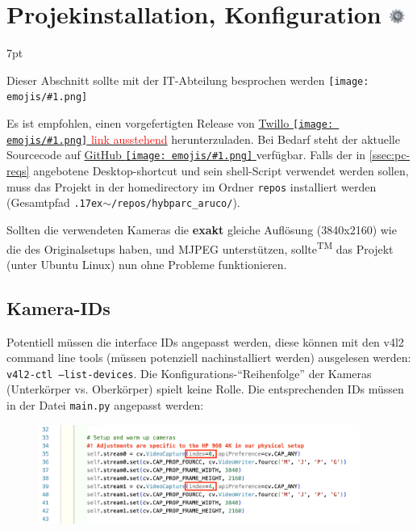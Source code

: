 \documentclass[a4paper, 10pt]{article}
\newcommand{\warn}[1]{\textcolor{red}{#1}}
\newcommand{\code}[1]{\texttt{#1}}
\newcommand{\emoji}[1]{
    \begingroup\normalfont
    \texttt{[image: emojis/\#1.png]}
    \endgroup
}
\newcommand{\realtilde}{{\raise.17ex\hbox{$\scriptstyle \mathtt{\sim}$}}}
\newenvironment{tooltip}{%
\small
\vspace*{-4mm}
    \def\FrameCommand{%
    \hspace{1pt}%
    {\color{tooltippipe}\vrule width 0.7mm}%
    {\color{tooltipshade}\vrule width 1.5mm}%
    \colorbox{tooltipshade}%
    }%
    \MakeFramed{\advance\hsize-\width\FrameRestore}%
    \noindent%
    \begin{adjustwidth}{}{7pt}%
    \vspace{2pt}\vspace{2pt}%
}
{%
    \vspace{2pt}\end{adjustwidth}\endMakeFramed%
}
\begin{document}
\section{Projekinstallation, Konfiguration \includegraphics[height=0.65em]{emojis/gear.png}}
\label{sec:installation-configuration}
\begin{tooltip}
    Dieser Abschnitt sollte mit der IT-Abteilung besprochen werden\emoji{technologist}
\end{tooltip}
Es ist empfohlen, einen vorgefertigten Release von \href{https://link-ausstehend}{Twillo\emoji{link} \warn{link ausstehend}} herunterzuladen. Bei Bedarf steht der aktuelle Sourcecode auf \href{https://github.com/leloomi/hybparc_aruco}{GitHub\emoji{link}} verfügbar. Falls der in \ref{ssec:pc-reqs} angebotene Desktop-shortcut und sein shell-Script verwendet werden sollen, muss das Projekt in der homedirectory im Ordner \code{repos} installiert werden (Gesamtpfad \code{\realtilde/repos/hybparc\_aruco/}).

Sollten die verwendeten Kameras die \textbf{exakt} gleiche Auflösung (3840x2160) wie die des Originalsetups haben, und MJPEG unterstützen, sollte\textsuperscript{\tiny TM} das Projekt (unter Ubuntu Linux) nun ohne Probleme funktionieren. 

\subsection{Kamera-IDs}
\label{ssec:cam-indices}
Potentiell müssen die interface IDs angepasst werden, diese können mit den v4l2 command line tools (müssen potenziell nachinstalliert werden) ausgelesen werden: \code{v4l2-ctl --list-devices}. Die Konfigurations-\enquote{Reihenfolge} der Kameras (Unterkörper vs. Oberkörper) spielt keine Rolle. Die entsprechenden IDs müssen in der Datei \code{main.py} angepasst werden:
\begin{figure}[H]
    \centering
    \includegraphics[width=10.5cm]{camera-indices.png}
\end{figure}
\end{document}
